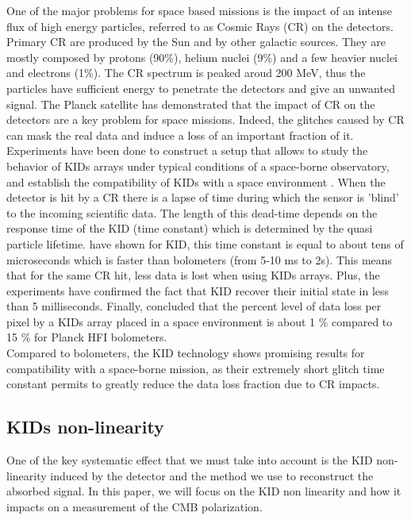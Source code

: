 One of the major problems for space based missions is the impact of an intense flux of high energy particles, referred to as Cosmic Rays (CR) on the detectors. Primary CR are produced by the Sun and by other galactic sources. They are mostly composed by protons (90\%), helium nuclei (9\%) and a few heavier nuclei and electrons (1\%). The CR spectrum is peaked aroud 200 MeV, thus the particles have sufficient energy to penetrate the detectors and give an unwanted signal. The Planck satellite \citep{2014A&A...571A..10P} has demonstrated that the impact of CR on the detectors are a key problem for space missions. Indeed, the glitches caused by CR can mask the real data and induce a loss of an important fraction of it.\\
Experiments have been done to construct a setup that allows to study the behavior of KIDs arrays under typical conditions of a space-borne observatory, and establish the compatibility of KIDs with a space environment \citep{2016A&A...592A..26C,2016SPIE.9914E..0NM}. When the detector is hit by a CR there is a lapse of time during which the sensor is 'blind' to the incoming scientific data. The length of this dead-time depends on the response time of the KID (time constant) which is determined by the quasi particle lifetime. \citet{2012ApPhL.100w2601M} have shown for KID, this time constant is equal to about tens of microseconds which is faster than bolometers (from 5-10 ms to 2s). This means that for the same CR hit, less data is lost when using KIDs arrays. Plus, the experiments have confirmed the fact that KID recover their initial state in less than 5 milliseconds. Finally, \citet{2016SPIE.9914E..0NM} concluded that the percent level of data loss per pixel by a KIDs array placed in a space environment is about 1 \% compared to 15 \% for Planck HFI bolometers.\\ Compared to bolometers, the KID technology shows promising results for compatibility with a space-borne mission, as their extremely short glitch time constant permits to greatly reduce the data loss fraction due to CR impacts. 

\subsection{KIDs non-linearity}

One of the key systematic effect that we must take into account is the KID non-linearity induced by the detector and the method we use to reconstruct the absorbed signal. In this paper, we will focus on the KID non linearity and how it impacts on a measurement of the CMB polarization.\\

